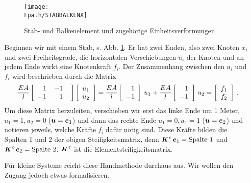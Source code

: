 \begin{figure}[tbp] \centering
\if {} \sidecaption \fi
\texttt{[image: \\Fpath/STABBALKENX]}
\caption{Stab- und Balkenelement und zugeh\"{o}rige Einheitsverformungen} \label{StabBalken}
\end{figure}%
Beginnen wir mit einem Stab, s. Abb. \ref{StabBalken}. Er hat zwei Enden, also zwei Knoten $x_i$ und zwei Freiheitsgrade, die horizontalen Verschiebungen $u_i$ der Knoten und an jedem Ende wirkt eine Knotenkraft $f_i$. Der Zusammenhang zwischen den $u_i$ und $f_i$ wird beschrieben durch die Matrix
\begin{align} \label{Eq42}
\frac{EA}{l}\left[ \barr {r @{\hspace{4mm}}r @{\hspace{4mm}}}
      1 & -1  \\
      -1 & 1 \\
     \earr \right]\left [\barr{c}  u_1 \\  u_2\earr \right ]
= \frac{EA}{l}\left[ \barr {r }
      1 \\
      -1  \\
     \earr \right]\,u_1 + \frac{EA}{l}\left[ \barr {r }
      1 \\
      -1  \\
     \earr \right]\,u_2 = \left [\barr{c}  f_1 \\  f_2\earr \right ]\,.
\end{align}
Um diese Matrix herzuleiten, verschieben wir erst das linke Ende um 1 Meter, $u_1 = 1, u_2 = 0$ ($\mbox{\boldmath $u$} = \mbox{\boldmath $e$}_1$) und dann das rechte Ende $u_1 = 0, u_1 = 1$ ($\mbox{\boldmath $u$} = \mbox{\boldmath $e$}_2$) und notieren jeweils, welche Kr\"{a}fte $f_i$ daf\"{u}r n\"{o}tig sind. Diese Kr\"{a}fte bilden die Spalten 1 und 2 der obigen Steifigkeitsmatrix, denn $\mbox{\boldmath $K$}^e\,\mbox{\boldmath $e$}_1 = \text{Spalte 1}$ und $\mbox{\boldmath $K$}^e\,\mbox{\boldmath $e$}_2 = \text{Spalte 2}$. $\mbox{\boldmath $K$}^e$ ist die Elementsteifigkeitsmatrix.

F\"{u}r kleine Systeme reicht diese Handmethode durchaus aus. Wir wollen den Zugang jedoch etwas formalisieren.

